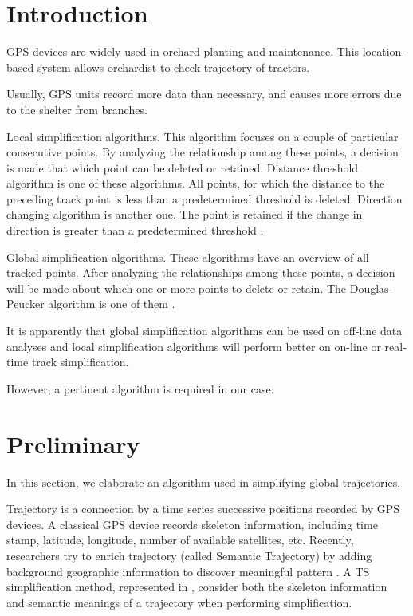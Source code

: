 
\section{Introduction}

GPS devices are widely used in orchard planting and maintenance. This location-based system allows orchardist to check trajectory of tractors. 

Usually, GPS units record more data than necessary, and causes more errors due to the shelter from branches. 

Local simplification algorithms. This algorithm focuses on a couple of particular consecutive points. By analyzing the relationship among these points, a decision is made that which point can be deleted or retained. Distance threshold algorithm is one of these algorithms. All points, for which the distance to the preceding track point is less than a predetermined threshold is deleted. Direction changing algorithm is another one. The point is retained if the change in direction is greater than a predetermined threshold  \cite{ivanov2012real}. 

Global simplification algorithms. These algorithms have an overview of all tracked points. After analyzing the relationships among these points, a decision will be made about which one or more points to delete or retain. The Douglas-Peucker algorithm is one of them \cite{douglas1973algorithms}.

It is apparently that global simplification algorithms can be used on off-line data analyses and local simplification algorithms will perform better on on-line or real-time track simplification. 

However, a pertinent algorithm is required in our case. 

\section{Preliminary}
In this section, we elaborate an algorithm used in simplifying global trajectories. 

Trajectory is a connection by a time series successive positions recorded by GPS devices. A classical GPS device records skeleton information, including time stamp, latitude, longitude, number of available satellites, etc. Recently, researchers try to enrich trajectory (called Semantic Trajectory) by adding background geographic information to discover meaningful pattern \cite{ying2011semantic}. A TS simplification method, represented in \cite{chen2009trajectory}, consider both the skeleton information and semantic meanings of a trajectory when performing simplification.

